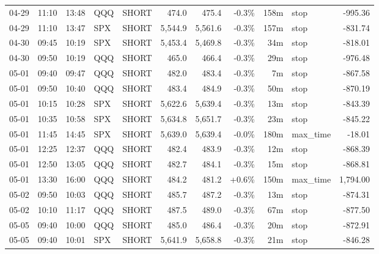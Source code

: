 \documentclass[11pt,a4paper,twoside]{article}
\begin{document}
\begin{center}
\begin{longtable}{>{\color{txtmain}}l l l l l r r r r >{\color{txtmain}}l r}
04-29 & 11:10 & 13:48 & QQQ & SHORT & 474.0 & 475.4 & \textcolor{lossred}{-0.3\%} & 158m & stop & \textcolor{lossred}{-995.36} \\
04-29 & 11:10 & 13:47 & SPX & SHORT & 5,544.9 & 5,561.6 & \textcolor{lossred}{-0.3\%} & 157m & stop & \textcolor{lossred}{-831.74} \\
04-30 & 09:45 & 10:19 & SPX & SHORT & 5,453.4 & 5,469.8 & \textcolor{lossred}{-0.3\%} & 34m & stop & \textcolor{lossred}{-818.01} \\
04-30 & 09:50 & 10:19 & QQQ & SHORT & 465.0 & 466.4 & \textcolor{lossred}{-0.3\%} & 29m & stop & \textcolor{lossred}{-976.48} \\
05-01 & 09:40 & 09:47 & QQQ & SHORT & 482.0 & 483.4 & \textcolor{lossred}{-0.3\%} & 7m & stop & \textcolor{lossred}{-867.58} \\
05-01 & 09:50 & 10:40 & QQQ & SHORT & 483.4 & 484.9 & \textcolor{lossred}{-0.3\%} & 50m & stop & \textcolor{lossred}{-870.19} \\
05-01 & 10:15 & 10:28 & SPX & SHORT & 5,622.6 & 5,639.4 & \textcolor{lossred}{-0.3\%} & 13m & stop & \textcolor{lossred}{-843.39} \\
05-01 & 10:35 & 10:58 & SPX & SHORT & 5,634.8 & 5,651.7 & \textcolor{lossred}{-0.3\%} & 23m & stop & \textcolor{lossred}{-845.22} \\
05-01 & 11:45 & 14:45 & SPX & SHORT & 5,639.0 & 5,639.4 & \textcolor{lossred}{-0.0\%} & 180m & max\_time & \textcolor{lossred}{-18.01} \\
05-01 & 12:25 & 12:37 & QQQ & SHORT & 482.4 & 483.9 & \textcolor{lossred}{-0.3\%} & 12m & stop & \textcolor{lossred}{-868.39} \\
05-01 & 12:50 & 13:05 & QQQ & SHORT & 482.7 & 484.1 & \textcolor{lossred}{-0.3\%} & 15m & stop & \textcolor{lossred}{-868.81} \\
05-01 & 13:30 & 16:00 & QQQ & SHORT & 484.2 & 481.2 & \textcolor{wingreen}{+0.6\%} & 150m & max\_time & \textcolor{wingreen}{1,794.00} \\
05-02 & 09:50 & 10:03 & QQQ & SHORT & 485.7 & 487.2 & \textcolor{lossred}{-0.3\%} & 13m & stop & \textcolor{lossred}{-874.31} \\
05-02 & 10:10 & 11:17 & QQQ & SHORT & 487.5 & 489.0 & \textcolor{lossred}{-0.3\%} & 67m & stop & \textcolor{lossred}{-877.50} \\
05-05 & 09:40 & 10:00 & QQQ & SHORT & 485.0 & 486.4 & \textcolor{lossred}{-0.3\%} & 20m & stop & \textcolor{lossred}{-872.91} \\
05-05 & 09:40 & 10:01 & SPX & SHORT & 5,641.9 & 5,658.8 & \textcolor{lossred}{-0.3\%} & 21m & stop & \textcolor{lossred}{-846.28} \\

\end{longtable}
\end{center}
\end{document}
